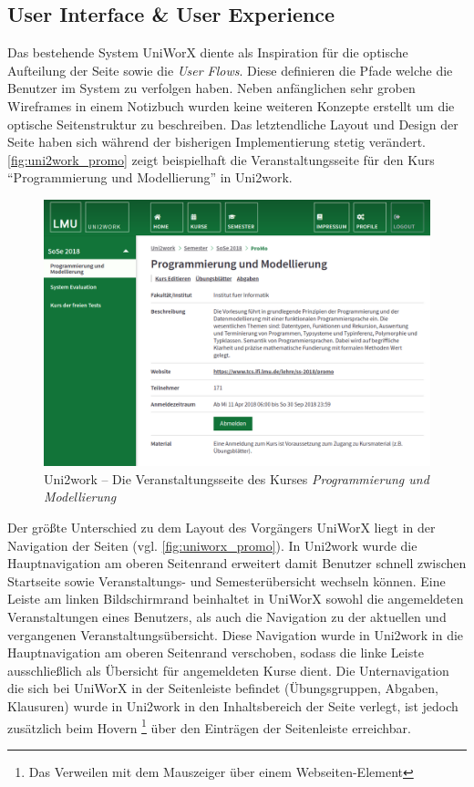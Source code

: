 \documentclass[11pt,a4paper,twoside,ngerman]{article}
\begin{document}
\subsection{User Interface \& User Experience} \label{sec:uni2work_user-interface}
Das bestehende System UniWorX diente als Inspiration für die optische Aufteilung der Seite sowie die \textit{User Flows}. Diese definieren die Pfade welche die Benutzer im System zu verfolgen haben.
Neben anfänglichen sehr groben Wireframes in einem Notizbuch wurden keine weiteren Konzepte erstellt um die optische Seitenstruktur zu beschreiben. Das letztendliche Layout und Design der Seite haben sich während der bisherigen Implementierung stetig verändert.
\autoref{fig:uni2work_promo} zeigt beispielhaft die Veranstaltungsseite für den Kurs "`Programmierung und Modellierung"' in Uni2work.

\begin{figure}[h]
    \centering
    \includegraphics[width=.9\textwidth]{images/uni2work_promo.png}
    \caption{Uni2work -- Die Veranstaltungsseite des Kurses \textit{Programmierung und Modellierung}}
    \label{fig:uni2work_promo}
\end{figure}

\noindent
Der größte Unterschied zu dem Layout des Vorgängers UniWorX liegt in der Navigation der Seiten (vgl. \autoref{fig:uniworx_promo}). In Uni2work wurde die Hauptnavigation am oberen Seitenrand erweitert damit Benutzer schnell zwischen Startseite sowie Veranstaltungs- und Semesterübersicht wechseln können.
Eine Leiste am linken Bildschirmrand beinhaltet in UniWorX sowohl die angemeldeten Veranstaltungen eines Benutzers, als auch die Navigation zu der aktuellen und vergangenen Veranstaltungsübersicht. Diese Navigation wurde in Uni2work in die Hauptnavigation am oberen Seitenrand verschoben, sodass die linke Leiste ausschließlich als Übersicht für angemeldeten Kurse dient. Die Unternavigation die sich bei UniWorX in der Seitenleiste befindet (Übungsgruppen, Abgaben, Klausuren) wurde in Uni2work in den Inhaltsbereich der Seite verlegt, ist jedoch zusätzlich beim Hovern \footnote{Das Verweilen mit dem Mauszeiger über einem Webseiten-Element} über den Einträgen der Seitenleiste erreichbar.
\end{document}
